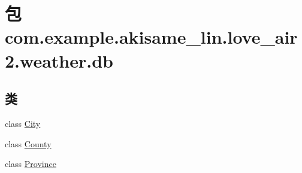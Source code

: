 \hypertarget{namespacecom_1_1example_1_1akisame__lin_1_1love__air2_1_1weather_1_1db}{}\section{包 com.\+example.\+akisame\+\_\+lin.\+love\+\_\+air2.\+weather.\+db}
\label{namespacecom_1_1example_1_1akisame__lin_1_1love__air2_1_1weather_1_1db}
\subsection*{类}
\begin{DoxyCompactItemize}
\item 
class \mbox{\hyperlink{classcom_1_1example_1_1akisame__lin_1_1love__air2_1_1weather_1_1db_1_1_city}{City}}
\item 
class \mbox{\hyperlink{classcom_1_1example_1_1akisame__lin_1_1love__air2_1_1weather_1_1db_1_1_county}{County}}
\item 
class \mbox{\hyperlink{classcom_1_1example_1_1akisame__lin_1_1love__air2_1_1weather_1_1db_1_1_province}{Province}}
\end{DoxyCompactItemize}
